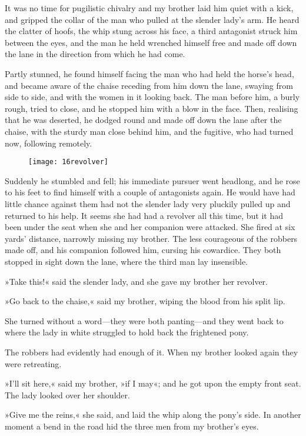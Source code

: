 It was no time for pugilistic chivalry and my brother laid him quiet with a kick, and gripped the collar of the man who pulled at the slender lady's arm. He heard the clatter of hoofs, the whip stung across his face, a third antagonist struck him between the eyes, and the man he held wrenched himself free and made off down the lane in the direction from which he had come.

Partly stunned, he found himself facing the man who had held the horse's head, and became aware of the chaise receding from him down the lane, swaying from side to side, and with the women in it looking back. The man before him, a burly rough, tried to close, and he stopped him with a blow in the face. Then, realising that he was deserted, he dodged round and made off down the lane after the chaise, with the sturdy man close behind him, and the fugitive, who had turned now, following remotely.

\begin{figure}[tb!]
\centering
\texttt{[image: 16revolver]}
\end{figure}

Suddenly he stumbled and fell; his immediate pursuer went headlong, and he rose to his feet to find himself with a couple of antagonists again. He would have had little chance against them had not the slender lady very pluckily pulled up and returned to his help. It seems she had had a revolver all this time, but it had been under the seat when she and her companion were attacked. She fired at six yards' distance, narrowly missing my brother. The less courageous of the robbers made off, and his companion followed him, cursing his cowardice. They both stopped in sight down the lane, where the third man lay insensible.

»Take this!« said the slender lady, and she gave my brother her revolver.

»Go back to the chaise,« said my brother, wiping the blood from his split lip.

She turned without a word—they were both panting—and they went back to where the lady in white struggled to hold back the frightened pony.

The robbers had evidently had enough of it. When my brother looked again they were retreating.

»I'll sit here,« said my brother, »if I may«; and he got upon the empty front seat. The lady looked over her shoulder.

»Give me the reins,« she said, and laid the whip along the pony's side. In another moment a bend in the road hid the three men from my brother's eyes.

